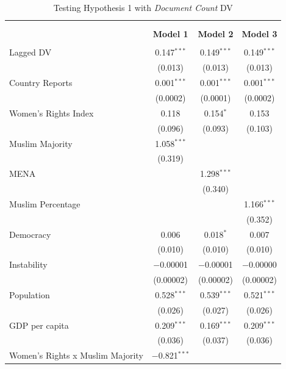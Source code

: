 \documentclass[11pt, oneside]{article}
\begin{document}
\begin{table}[!htbp] \centering 
  \caption{Testing Hypothesis 1 with \emph{Document Count} DV}
    \label{table:negbin} 
\begin{tabular}{@{\extracolsep{5pt}}lccc} 
\\[-1.8ex]\hline \\[-1.8ex] 
\\[-1.8ex] & \textbf{Model 1} & \textbf{Model 2} & \textbf{Model 3}\\ 
\hline \\[-1.8ex] 
 Lagged DV & 0.147$^{***}$ & 0.149$^{***}$ & 0.149$^{***}$ \\ 
  & (0.013) & (0.013) & (0.013) \\ 
  Country Reports & 0.001$^{***}$ & 0.001$^{***}$ & 0.001$^{***}$ \\ 
  & (0.0002) & (0.0001) & (0.0002) \\ 
  Women's Rights Index & 0.118 & 0.154$^{*}$ & 0.153 \\ 
  & (0.096) & (0.093) & (0.103) \\ 
  Muslim Majority & 1.058$^{***}$ &  &  \\ 
  & (0.319) &  &  \\ 
  MENA &  & 1.298$^{***}$ &  \\ 
  &  & (0.340) &  \\ 
  Muslim Percentage &  &  & 1.166$^{***}$ \\ 
  &  &  & (0.352) \\ 
  Democracy & 0.006 & 0.018$^{*}$ & 0.007 \\ 
  & (0.010) & (0.010) & (0.010) \\ 
  Instability & $-$0.00001 & $-$0.00001 & $-$0.00000 \\ 
  & (0.00002) & (0.00002) & (0.00002) \\ 
  Population & 0.528$^{***}$ & 0.539$^{***}$ & 0.521$^{***}$ \\ 
  & (0.026) & (0.027) & (0.026) \\ 
  GDP per capita & 0.209$^{***}$ & 0.169$^{***}$ & 0.209$^{***}$ \\ 
  & (0.036) & (0.037) & (0.036) \\ 
  Women's Rights x Muslim Majority & $-$0.821$^{***}$ &  &  \\ 

\end{tabular}
\end{table}
\end{document}
